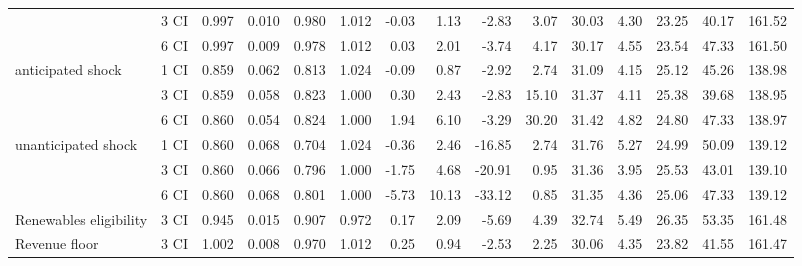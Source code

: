 \begin{tabular}{ll*{13}{r}}
              & 3 CI &                    0.997 &  0.010 &  0.980 &  1.012 &                   -0.03 &   1.13 &   -2.83 &   3.07 &          30.03 &  4.30 &  23.25 &  40.17 &                 161.52 \\
              & 6 CI &                    0.997 &  0.009 &  0.978 &  1.012 &                    0.03 &   2.01 &   -3.74 &   4.17 &          30.17 &  4.55 &  23.54 &  47.33 &                 161.50 \\
anticipated shock & 1 CI &                    0.859 &  0.062 &  0.813 &  1.024 &                   -0.09 &   0.87 &   -2.92 &   2.74 &          31.09 &  4.15 &  25.12 &  45.26 &                 138.98 \\
              & 3 CI &                    0.859 &  0.058 &  0.823 &  1.000 &                    0.30 &   2.43 &   -2.83 &  15.10 &          31.37 &  4.11 &  25.38 &  39.68 &                 138.95 \\
              & 6 CI &                    0.860 &  0.054 &  0.824 &  1.000 &                    1.94 &   6.10 &   -3.29 &  30.20 &          31.42 &  4.82 &  24.80 &  47.33 &                 138.97 \\
unanticipated shock & 1 CI &                    0.860 &  0.068 &  0.704 &  1.024 &                   -0.36 &   2.46 &  -16.85 &   2.74 &          31.76 &  5.27 &  24.99 &  50.09 &                 139.12 \\
              & 3 CI &                    0.860 &  0.066 &  0.796 &  1.000 &                   -1.75 &   4.68 &  -20.91 &   0.95 &          31.36 &  3.95 &  25.53 &  43.01 &                 139.10 \\
              & 6 CI &                    0.860 &  0.068 &  0.801 &  1.000 &                   -5.73 &  10.13 &  -33.12 &   0.85 &          31.35 &  4.36 &  25.06 &  47.33 &                 139.12 \\
Renewables eligibility & 3 CI &                    0.945 &  0.015 &  0.907 &  0.972 &                    0.17 &   2.09 &   -5.69 &   4.39 &          32.74 &  5.49 &  26.35 &  53.35 &                 161.48 \\
Revenue floor & 3 CI &                    1.002 &  0.008 &  0.970 &  1.012 &                    0.25 &   0.94 &   -2.53 &   2.25 &          30.06 &  4.35 &  23.82 &  41.55 &                 161.47 \\
\bottomrule
\end{tabular}

